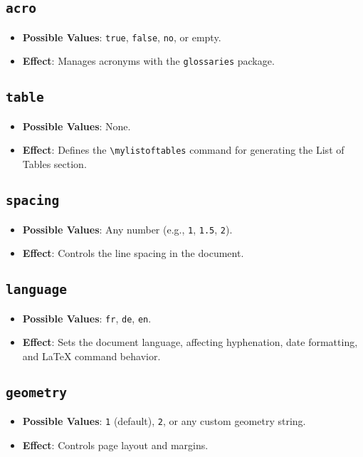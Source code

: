 \documentclass[12pt,twoside]{report}
\begin{document}
\subsection{\texttt{acro}}
\begin{itemize}
    \item \textbf{Possible Values}: \texttt{true}, \texttt{false}, \texttt{no}, or empty.
    \item \textbf{Effect}: Manages acronyms with the \texttt{glossaries} package.
\end{itemize}

\subsection{\texttt{table}}
\begin{itemize}
    \item \textbf{Possible Values}: None.
    \item \textbf{Effect}: Defines the \texttt{\textbackslash mylistoftables} command for generating the List of Tables section.
\end{itemize}

\subsection{\texttt{spacing}}
\begin{itemize}
    \item \textbf{Possible Values}: Any number (e.g., \texttt{1}, \texttt{1.5}, \texttt{2}).
    \item \textbf{Effect}: Controls the line spacing in the document.
\end{itemize}

\subsection{\texttt{language}}
\begin{itemize}
    \item \textbf{Possible Values}: \texttt{fr}, \texttt{de}, \texttt{en}.
    \item \textbf{Effect}: Sets the document language, affecting hyphenation, date formatting, and LaTeX command behavior.
\end{itemize}

\subsection{\texttt{geometry}}
\begin{itemize}
    \item \textbf{Possible Values}: \texttt{1} (default), \texttt{2}, or any custom geometry string.
    \item \textbf{Effect}: Controls page layout and margins.
\end{itemize}
\end{document}
